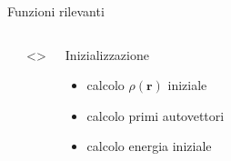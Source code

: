 \documentclass[8pt]{beamer}
\newcommand\dens{\rho(\mathbf{r})}
\begin{document}
\begin{frame}{Funzioni rilevanti}
{\begin{minipage}[t][0.5\textheight][t]{\textwidth}
\begin{columns}
\begin{flushleft}
				\end{flushleft}    	

				
				
				\only<>{
					\begin{block}{Inizializzazione} 
						\begin{itemize}
							\item calcolo $\dens$ iniziale
							\item calcolo primi autovettori
							\item calcolo energia iniziale
					\end{itemize}
					\end{block}
				}
				

\end{columns}
\end{minipage}}
\end{frame}
\end{document}
